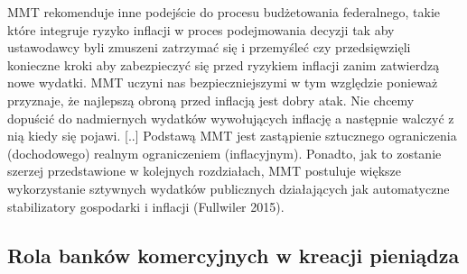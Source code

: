 \documentclass[
]{book}
\begin{document}
MMT rekomenduje inne podejście do procesu budżetowania federalnego, takie które integruje ryzyko inflacji w proces podejmowania decyzji tak aby ustawodawcy byli zmuszeni zatrzymać się i przemyśleć czy przedsięwzięli konieczne kroki aby zabezpieczyć się przed ryzykiem inflacji zanim zatwierdzą nowe wydatki. MMT uczyni nas bezpieczniejszymi w tym względzie ponieważ przyznaje, że najlepszą obroną przed inflacją jest dobry atak. Nie chcemy dopuścić do nadmiernych wydatków wywołujących inflację a następnie walczyć z nią kiedy się pojawi. {[}..{]} Podstawą MMT jest zastąpienie sztucznego ograniczenia (dochodowego) realnym ograniczeniem (inflacyjnym).
Ponadto, jak to zostanie szerzej przedstawione w kolejnych rozdziałach, MMT postuluje większe wykorzystanie sztywnych wydatków publicznych działających jak automatyczne stabilizatory gospodarki i inflacji (Fullwiler 2015).

\hypertarget{rola-bankuxf3w-komercyjnych-w-kreacji-pieniux105dza}{%
\subsection{Rola banków komercyjnych w kreacji pieniądza}\label{rola-bankuxf3w-komercyjnych-w-kreacji-pieniux105dza}}
\end{document}
